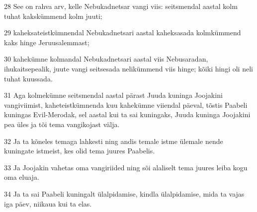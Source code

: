 \par 28 See on rahva arv, kelle Nebukadnetsar vangi viis: seitsmendal aastal kolm tuhat kakskümmend kolm juuti;
\par 29 kaheksateistkümnendal Nebukadnetsari aastal kaheksasada kolmkümmend kaks hinge Jeruusalemmast;
\par 30 kahekümne kolmandal Nebukadnetsari aastal viis Nebusaradan, ihukaitsepealik, juute vangi seitsesada nelikümmend viis hinge; kõiki hingi oli neli tuhat kuussada.
\par 31 Aga kolmekümne seitsmendal aastal pärast Juuda kuninga Joojakini vangiviimist, kaheteistkümnenda kuu kahekümne viiendal päeval, tõstis Paabeli kuningas Evil-Merodak, sel aastal kui ta sai kuningaks, Juuda kuninga Joojakini pea üles ja tõi tema vangikojast välja.
\par 32 Ja ta kõneles temaga lahkesti ning andis temale istme ülemale nende kuningate istmeist, kes olid tema juures Paabelis.
\par 33 Ja Joojakin vahetas oma vangiriided ning sõi alaliselt tema juures leiba kogu oma eluaja.
\par 34 Ja ta sai Paabeli kuningalt ülalpidamise, kindla ülalpidamise, mida ta vajas iga päev, niikaua kui ta elas.



